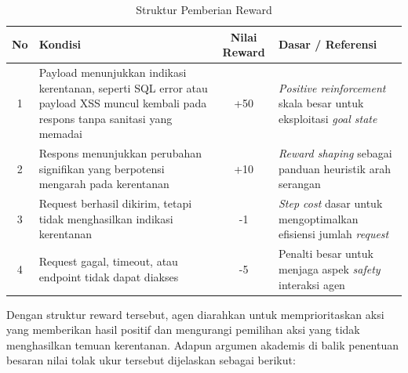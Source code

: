\begin{table}[H]
\centering
\begin{tabular}{|c|p{7cm}|c|p{4.5cm}|}
\hline
\textbf{No} & \textbf{Kondisi} & \textbf{Nilai Reward} & \textbf{Dasar / Referensi} \\ \hline

1 & Payload menunjukkan indikasi kerentanan, seperti SQL error atau payload XSS muncul kembali pada respons tanpa sanitasi yang memadai & +50 & \textit{Positive reinforcement} skala besar untuk eksploitasi \textit{goal state} \cite{erdodi2021} \\ \hline

2 & Respons menunjukkan perubahan signifikan yang berpotensi mengarah pada kerentanan & +10 & \textit{Reward shaping} sebagai panduan heuristik arah serangan \cite{nguyen2020} \\ \hline

3 & Request berhasil dikirim, tetapi tidak menghasilkan indikasi kerentanan & -1 & \textit{Step cost} dasar untuk mengoptimalkan efisiensi jumlah \textit{request} \cite{sutton2018} \\ \hline

4 & Request gagal, timeout, atau endpoint tidak dapat diakses & -5 & Penalti besar untuk menjaga aspek \textit{safety} interaksi agen \cite{zennaro2020} \\ \hline

\end{tabular}
\caption{Struktur Pemberian Reward}
\label{tab:struktur_reward}
\end{table}

Dengan struktur reward tersebut, agen diarahkan untuk memprioritaskan aksi yang memberikan hasil positif dan mengurangi pemilihan aksi yang tidak menghasilkan temuan kerentanan. Adapun argumen akademis di balik penentuan besaran nilai tolak ukur tersebut dijelaskan sebagai berikut:


